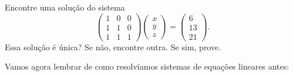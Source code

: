 \begin{exerc}
	Encontre uma solução do sistema
	\[\begin{pmatrix}
	1 & 0 & 0\\ 1&1&0\\1&1&1
	\end{pmatrix}\begin{pmatrix}
	x\\y\\z
	\end{pmatrix}=\begin{pmatrix}
	6\\13\\21
	\end{pmatrix}.\] Essa solução é única? Se não, encontre outra. Se sim, prove.
\end{exerc}

Vamos agora lembrar de como resolvíamos sistemas de equações lineares antes:


